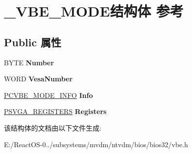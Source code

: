 \hypertarget{struct___v_b_e___m_o_d_e}{}\section{\+\_\+\+V\+B\+E\+\_\+\+M\+O\+D\+E结构体 参考}
\label{struct___v_b_e___m_o_d_e}
\subsection*{Public 属性}
\begin{DoxyCompactItemize}
\item 
\mbox{\label{struct___v_b_e___m_o_d_e_a6ef91d98394dd1a1e5a1b82356be452a}} 
B\+Y\+TE {\bfseries Number}
\item 
\mbox{\label{struct___v_b_e___m_o_d_e_a56e7a4c5279a79bb73f70a01ca7c5b89}} 
W\+O\+RD {\bfseries Vesa\+Number}
\item 
\mbox{\label{struct___v_b_e___m_o_d_e_a4feaffbec215a9ce4ff577b49729eeab}} 
\hyperlink{struct___v_b_e___m_o_d_e___i_n_f_o}{P\+C\+V\+B\+E\+\_\+\+M\+O\+D\+E\+\_\+\+I\+N\+FO} {\bfseries Info}
\item 
\mbox{\label{struct___v_b_e___m_o_d_e_ae7bfeed7f83f1201b6bc8e977063c216}} 
\hyperlink{struct___s_v_g_a___r_e_g_i_s_t_e_r_s}{P\+S\+V\+G\+A\+\_\+\+R\+E\+G\+I\+S\+T\+E\+RS} {\bfseries Registers}
\end{DoxyCompactItemize}


该结构体的文档由以下文件生成\+:\begin{DoxyCompactItemize}
\item 
E\+:/\+React\+O\+S-\/0../subsystems/mvdm/ntvdm/bios/bios32/vbe.\+h\end{DoxyCompactItemize}
